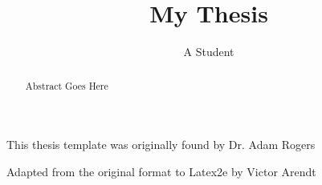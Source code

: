 
\title{My Thesis}  %
\author{A Student} %
\masterscience
\dissertation
\copyrightnotice
{}
\maketitle

\begin{frontmatter}

\begin{abstract}
Abstract Goes Here
\end{abstract}

\begin{acknowledgement}

This thesis template was originally found by Dr. Adam Rogers

Adapted from the original format to Latex2e by Victor Arendt

\end{acknowledgement}

\tableofcontents
\listoffigures
\listoftables

\end{frontmatter}

